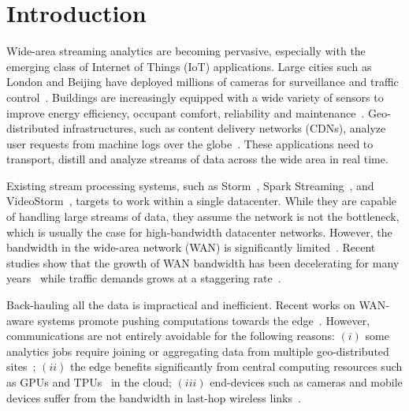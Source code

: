 \section{Introduction}

Wide-area streaming analytics are becoming pervasive, especially with the
emerging class of Internet of Things (IoT) applications.  Large cities such as
London and Beijing have deployed millions of cameras for surveillance and
traffic control~\cite{london.surveillance, skynet}. Buildings are increasingly
equipped with a wide variety of sensors to improve energy efficiency, occupant
comfort, reliability and
maintenance~\cite{krioukov2012building}. Geo-distributed infrastructures, such as
content delivery networks (CDNs), analyze user requests from machine logs over the
globe~\cite{mukerjee2015practical}. These applications need to transport,
distill and analyze streams of data across the wide area in real time.

Existing stream processing systems, such as Storm~\cite{toshniwal2014storm},
Spark Streaming~\cite{zaharia2013discretized}, and
VideoStorm~\cite{zhang2017live}, targets to work within a single datacenter.
While they are capable of handling large streams of data, they assume the
network is not the bottleneck, which is usually the case for high-bandwidth
datacenter networks. However, the bandwidth in the wide-area network (WAN) is
significantly limited~\cite{hsieh17gaia, vulimiri2015global}. Recent studies
show that the growth of WAN bandwidth has been decelerating for many
years~\cite{global2016telegeography} while traffic demands grows at a staggering
rate~\cite{index2013zettabyte}.

Back-hauling all the data is impractical and inefficient. Recent
works on WAN-aware systems promote pushing computations towards the
edge~\cite{satyanarayanan2009case, rabkin2014aggregation, pu2015low}. However,
communications are not entirely avoidable for the following reasons: $(i)$ some
analytics jobs require joining or aggregating data from multiple geo-distributed
sites~\cite{pu2015low, viswanathan2016clarinet}; $(ii)$ the edge benefits
significantly from central computing resources such as GPUs and
TPUs~\cite{abadi2016tensorflow} in the cloud; $(iii)$ end-devices such as cameras
and mobile devices suffer from the bandwidth in last-hop wireless
links~\cite{zhang2015design, abari2017enabling}.


